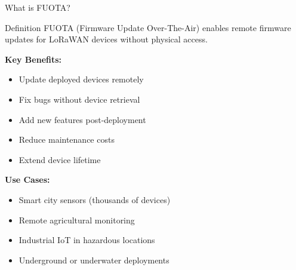 \documentclass{beamer}
\begin{document}
\begin{frame}{What is FUOTA?}
\begin{block}{Definition}
FUOTA (Firmware Update Over-The-Air) enables remote firmware updates for LoRaWAN devices without physical access.
\end{block}

\vspace{0.3cm}

\textbf{Key Benefits:}
\begin{itemize}
    \item Update deployed devices remotely
    \item Fix bugs without device retrieval
    \item Add new features post-deployment
    \item Reduce maintenance costs
    \item Extend device lifetime
\end{itemize}

\vspace{0.3cm}

\textbf{Use Cases:}
\begin{itemize}
    \item Smart city sensors (thousands of devices)
    \item Remote agricultural monitoring
    \item Industrial IoT in hazardous locations
    \item Underground or underwater deployments
\end{itemize}
\end{frame}
\end{document}
